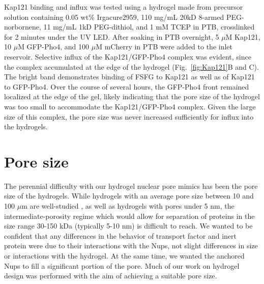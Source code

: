 
Kap121 binding and influx was tested using a hydrogel made from precursor solution containing 0.05 wt\% Irgacure2959, 110 mg/mL 20kD 8-armed PEG-norbornene, 11 mg/mL 1kD PEG-dithiol, and 1 mM TCEP in PTB, crosslinked for 2 minutes under the UV LED.  After soaking in PTB overnight, 5 $\mu$M Kap121, 10 $\mu$M GFP-Pho4, and 100 $\mu$M mCherry in PTB were added to the inlet reservoir.  Selective influx of the Kap121/GFP-Pho4 complex was evident, since the complex accumulated at the edge of the hydrogel (Fig.~\ref{fig:Kap121}B and C).  The bright band demonstrates binding of FSFG to Kap121 as well as of Kap121 to GFP-Pho4.  Over the course of several hours, the GFP-Pho4 front remained localized at the edge of the gel, likely indicating that the pore size of the hydrogel was too small to accommodate the Kap121/GFP-Pho4 complex.  Given the large size of this complex, the pore size was never increased sufficiently for influx into the hydrogels.


\section{Pore size}
\label{sec:pore-size}

The perennial difficulty with our hydrogel nuclear pore mimics has been the pore size of the hydrogels. While hydrogels with an average pore size between 10 and 100 $\mu$m are well-studied \cite{annabi10}, as well as hydrogels with pores under 5 nm, the intermediate-porosity regime which would allow for separation of proteins in the size range 30-150 kDa (typically 5-10 nm) is difficult to reach.  We wanted to be confident that any differences in the behavior of transport factor and inert protein were due to their interactions with the Nups, not slight differences in size or interactions with the hydrogel.  At the same time, we wanted the anchored Nups to fill a significant portion of the pore.  Much of our work on hydrogel design was performed with the aim of achieving a suitable pore size.

